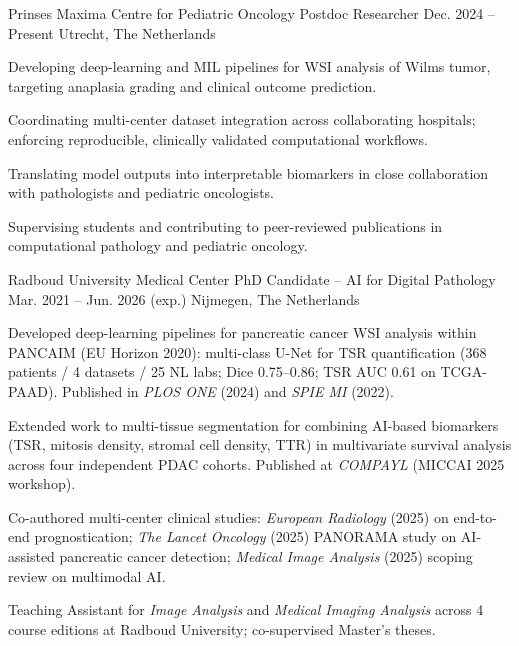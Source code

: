 

\begin{cventries}

\cventry
    {Prinses Maxima Centre for Pediatric Oncology} %
    {Postdoc Researcher} %
    {Dec. 2024 -- Present} %
    {Utrecht, The Netherlands} %
    {
      \begin{cvitems}
        \item {Developing deep-learning and MIL pipelines for WSI analysis of Wilms tumor, targeting anaplasia grading and clinical outcome prediction.}
        \item {Coordinating multi-center dataset integration across collaborating hospitals; enforcing reproducible, clinically validated computational workflows.}
        \item {Translating model outputs into interpretable biomarkers in close collaboration with pathologists and pediatric oncologists.}
        \item {Supervising students and contributing to peer-reviewed publications in computational pathology and pediatric oncology.}
      \end{cvitems}
    }

\cventry
    {Radboud University Medical Center} %
    {PhD Candidate -- AI for Digital Pathology} %
    {Mar. 2021 -- Jun. 2026 (exp.)} %
    {Nijmegen, The Netherlands} %
    {
      \begin{cvitems}
        \item {Developed deep-learning pipelines for pancreatic cancer WSI analysis within PANCAIM (EU Horizon 2020): multi-class U-Net for TSR quantification (368 patients / 4 datasets / 25 NL labs; Dice 0.75--0.86; TSR AUC 0.61 on TCGA-PAAD). Published in \textit{PLOS ONE} (2024) and \textit{SPIE MI} (2022).}
        \item {Extended work to multi-tissue segmentation for combining AI-based biomarkers (TSR, mitosis density, stromal cell density, TTR) in multivariate survival analysis across four independent PDAC cohorts. Published at \textit{COMPAYL} (MICCAI 2025 workshop).}
        \item {Co-authored multi-center clinical studies: \textit{European Radiology} (2025) on end-to-end prognostication; \textit{The Lancet Oncology} (2025) PANORAMA study on AI-assisted pancreatic cancer detection; \textit{Medical Image Analysis} (2025) scoping review on multimodal AI.}
        \item {Teaching Assistant for \textit{Image Analysis} and \textit{Medical Imaging Analysis} across 4 course editions at Radboud University; co-supervised Master's theses.}
      \end{cvitems}
    }


\end{cventries}
